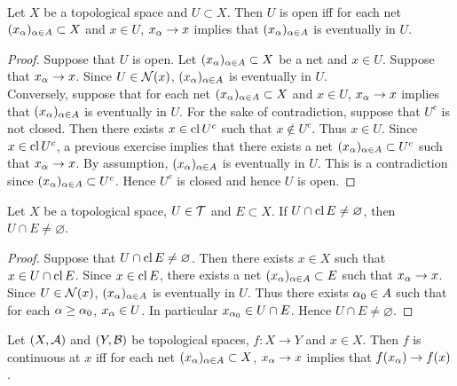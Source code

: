 \documentclass{book}
\begin{document}
	\begin{ex}   \\
		Let $X$ be a topological space and $U \subset X$. Then $U$ is open iff for each net $(x_{\alpha})_{\alpha \in A} \subset X$ and $x \in U$, $x_{\alpha} \rightarrow x$ implies that $(x_{\alpha})_{\alpha \in A} $ is eventually in $U$.
	\end{ex}

	\begin{proof}
		Suppose that $U$ is open. Let $(x_{\alpha})_{\alpha \in A} \subset X$ be a net and $x \in U$. Suppose that $x_{\alpha} \rightarrow x$. Since $U \in \mathcal{N}(x)$, $(x_{\alpha})_{\alpha \in A}$ is eventually in $U$. \\
		Conversely, suppose that for each net $(x_{\alpha})_{\alpha \in A} \subset X$ and $x \in U$, $x_{\alpha} \rightarrow x$ implies that $(x_{\alpha})_{\alpha \in A} $ is eventually in $U$. For the sake of contradiction, suppose that $U^c$ is not closed. Then there exists $x \in \operatorname{cl} U^c$ such that $x \not \in U^c$. Thus $x \in U$. Since $x \in \operatorname{cl} U^c$, a previous exercise implies that there exists a net $(x_{\alpha})_{\alpha \in A} \subset U^c$ such that $x_{\alpha} \rightarrow x$. By assumption, $(x_{\alpha})_{\alpha \in A}$ is eventually in $U$. This is a contradiction since $(x_{\alpha})_{\alpha \in A} \subset U^c$. Hence $U^c$ is closed and hence $U$ is open. 
	\end{proof}

	\begin{ex} 
		Let $X$ be a topological space, $U \in \mathcal{T}$ and $E \subset X$. If $U \cap \operatorname{cl} E \neq \varnothing$, then $U \cap E \neq \varnothing$. 
	\end{ex}

	\begin{proof}
		Suppose that $U \cap \operatorname{cl} E \neq \varnothing$. Then there exists $x \in X$ such that $x \in U \cap \operatorname{cl} E$. Since $x \in \operatorname{cl} E$, there exists a net $(x_{\alpha})_{\alpha \in A} \subset E$ such that $x_{\alpha} \rightarrow x$. Since $U \in \mathcal{N}(x)$, $(x_{\alpha})_{\alpha \in A}$ is eventually in $U$. Thus there exists $\alpha_0 \in A$ such that for each $\alpha \geq \alpha_0$, $x_{\alpha} \in U$. In particular $x_{\alpha_0} \in U \cap E$. Hence $U \cap E \neq \varnothing$. 
	\end{proof}
	
	\begin{ex} 
	Let $(X,\mathcal{A})$ and $(Y,\mathcal{B})$ be topological spaces, $f:X \rightarrow Y$ and $x \in X$. Then $f$ is continuous at $x$ iff for each net $(x_{\alpha})_{\alpha \in A} \subset X$, $x_{\alpha} \rightarrow x$ implies that $f(x_{\alpha}) \rightarrow f(x)$. 
	\end{ex}
	
\end{document}
